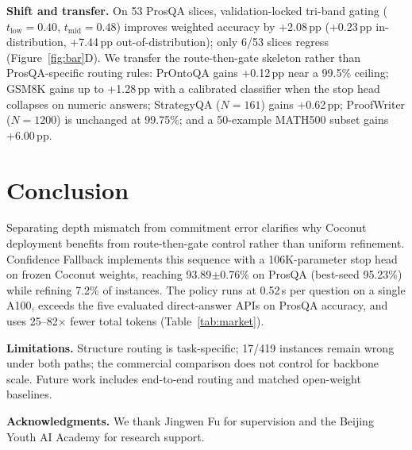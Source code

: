 \documentclass{article}
\theoremstyle{compactthm}
\theoremstyle{compactdef}
\begin{document}
\textbf{Shift and transfer.} On 53 ProsQA slices, validation-locked tri-band gating ($t_{\mathrm{low}}{=}0.40$, $t_{\mathrm{mid}}{=}0.48$) improves weighted accuracy by +2.08\,pp (+0.23\,pp in-distribution, +7.44\,pp out-of-distribution); only 6/53 slices regress (Figure~\ref{fig:bar}D). We transfer the route-then-gate skeleton rather than ProsQA-specific routing rules: PrOntoQA gains +0.12\,pp near a 99.5\% ceiling; GSM8K gains up to +1.28\,pp with a calibrated classifier \citep{cobbe2021training} when the stop head collapses on numeric answers; StrategyQA ($N{=}161$) gains +0.62\,pp; ProofWriter ($N{=}1200$) is unchanged at 99.75\%; and a 50-example MATH500 subset gains +6.00\,pp.

\section{Conclusion}
\label{sec:concl}
Separating depth mismatch from commitment error clarifies why Coconut deployment benefits from route-then-gate control rather than uniform refinement. Confidence Fallback implements this sequence with a 106K-parameter stop head on frozen Coconut weights, reaching 93.89$\pm$0.76\% on ProsQA (best-seed 95.23\%) while refining 7.2\% of instances. The policy runs at 0.52\,s per question on a single A100, exceeds the five evaluated direct-answer APIs on ProsQA accuracy, and uses 25--82$\times$ fewer total tokens (Table~\ref{tab:market}).

\textbf{Limitations.} Structure routing is task-specific; 17/419 instances remain wrong under both paths; the commercial comparison does not control for backbone scale. Future work includes end-to-end routing and matched open-weight baselines.

\noindent\textbf{Acknowledgments.} We thank Jingwen Fu for supervision and the Beijing Youth AI Academy for research support.
\end{document}
